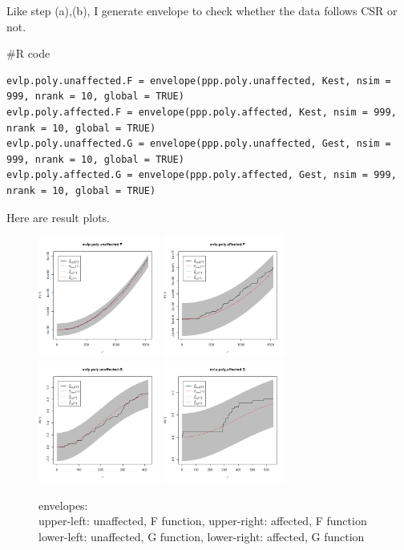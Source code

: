 \documentclass{article}
\newenvironment{Rcode}%
{%
    \begin{mdframed}
    \#R code
    \begin{small}
}
{%
    \end{small}
    \end{mdframed}
}
\begin{document}
Like step (a),(b), I generate envelope to check whether the data follows CSR or not.

\begin{Rcode}
    \begin{verbatim}
evlp.poly.unaffected.F = envelope(ppp.poly.unaffected, Kest, nsim = 999, nrank = 10, global = TRUE)
evlp.poly.affected.F = envelope(ppp.poly.affected, Kest, nsim = 999, nrank = 10, global = TRUE)
evlp.poly.unaffected.G = envelope(ppp.poly.unaffected, Gest, nsim = 999, nrank = 10, global = TRUE)
evlp.poly.affected.G = envelope(ppp.poly.affected, Gest, nsim = 999, nrank = 10, global = TRUE)
    \end{verbatim}
\end{Rcode}

Here are result plots.
\begin{figure}[!h]
    \centering
    \includegraphics[width=4cm]{prob1_poly_window_unaffected_evlp_F.png}
    \includegraphics[width=4cm]{prob1_poly_window_affected_evlp_F.png} \\ 
    \includegraphics[width=4cm]{prob1_poly_window_unaffected_evlp_G.png}
    \includegraphics[width=4cm]{prob1_poly_window_affected_evlp_G.png}
    \caption{envelopes: \\
    upper-left: unaffected, F function, upper-right: affected, F function\\
    lower-left: unaffected, G function, lower-right: affected, G function}
\end{figure}
\end{document}
